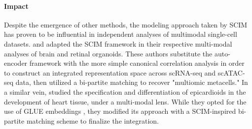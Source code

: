 \paragraph{Impact} Despite the emergence of other methods, the modeling approach taken by SCIM has proven to be influential in independent analyses of multimodal single-cell datasets. 
\citeauthor{fleck2023} and \citeauthor{wahle2023} adapted the SCIM framework in their respective multi-modal analyses of brain and retinal organoids.
These authors substitute the auto-encoder framework with the more simple canonical correlation analysis in order to construct an integrated representation space across scRNA-seq and scATAC-seq data, then utilized a bi-partite matching to recover "multiomic metacells."
In a similar vein, \citeauthor{meier2023} studied the specification and differentiation of epicardioids in the development of heart tissue, under a multi-modal lens.
While they opted for the use of GLUE embeddings \cite{cao2022}, they modified its approach with a SCIM-inspired bi-partite matching scheme to finalize the integration.
